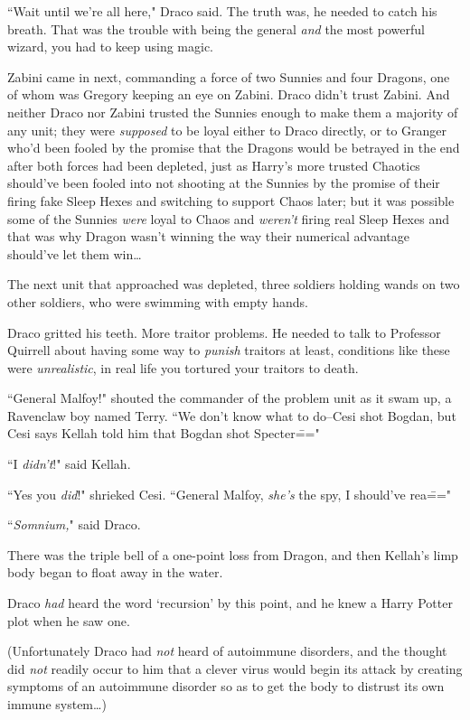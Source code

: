 ``Wait until we're all here," Draco said. The truth was, he needed to catch his breath. That was the trouble with being the general \emph{and} the most powerful wizard, you had to keep using magic.

Zabini came in next, commanding a force of two Sunnies and four Dragons, one of whom was Gregory keeping an eye on Zabini. Draco didn't trust Zabini. And neither Draco nor Zabini trusted the Sunnies enough to make them a majority of any unit; they were \emph{supposed} to be loyal either to Draco directly, or to Granger who'd been fooled by the promise that the Dragons would be betrayed in the end after both forces had been depleted, just as Harry's more trusted Chaotics should've been fooled into not shooting at the Sunnies by the promise of their firing fake Sleep Hexes and switching to support Chaos later; but it was possible some of the Sunnies \emph{were} loyal to Chaos and \emph{weren't} firing real Sleep Hexes and that was why Dragon wasn't winning the way their numerical advantage should've let them win{\ldots}

The next unit that approached was depleted, three soldiers holding wands on two other soldiers, who were swimming with empty hands.

Draco gritted his teeth. More traitor problems. He needed to talk to Professor Quirrell about having some way to \emph{punish} traitors at least, conditions like these were \emph{unrealistic}, in real life you tortured your traitors to death.

``General Malfoy!" shouted the commander of the problem unit as it swam up, a Ravenclaw boy named Terry. ``We don't know what to do\---Cesi shot Bogdan, but Cesi says Kellah told him that Bogdan shot Specter\==="

``I \emph{didn't}!" said Kellah.

``Yes you \emph{did}!" shrieked Cesi. ``General Malfoy, \emph{she's} the spy, I should've rea\==="

``\emph{Somnium,}" said Draco.

There was the triple bell of a one-point loss from Dragon, and then Kellah's limp body began to float away in the water.

Draco \emph{had} heard the word `recursion' by this point, and he knew a Harry Potter plot when he saw one.

(Unfortunately Draco had \emph{not} heard of autoimmune disorders, and the thought did \emph{not} readily occur to him that a clever virus would begin its attack by creating symptoms of an autoimmune disorder so as to get the body to distrust its own immune system{\ldots})

